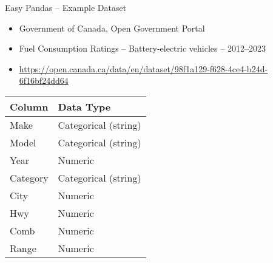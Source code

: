 \documentclass[ignorenonframetext,xcolor=x11names]{beamer}
\begin{document}







\begin{frame}{Easy Pandas -- Example Dataset}
\begin{itemize}
  \item Government of Canada, Open Government Portal
  \item Fuel Consumption Ratings -- Battery-electric vehicles -- 2012--2023
  \item \href{https://open.canada.ca/data/en/dataset/98f1a129-f628-4ce4-b24d-6f16bf24dd64}{https://open.canada.ca/data/en/dataset/98f1a129-f628-4ce4-b24d-6f16bf24dd64}
\end{itemize} 

\vspace{\baselineskip}
\centering
\footnotesize

	\begin{tabular}{|l|l|} \hline
	  {\bf Column} & {\bf Data Type} \\ \hline \hline
	  Make & Categorical (string) \\ 
	  Model & Categorical (string) \\
	  Year & Numeric \\
	  Category & Categorical (string)\\
	  City & Numeric \\
	  Hwy & Numeric \\
	  Comb & Numeric \\
	  Range & Numeric \\ \hline
	\end{tabular}
\end{frame}
\end{document}
